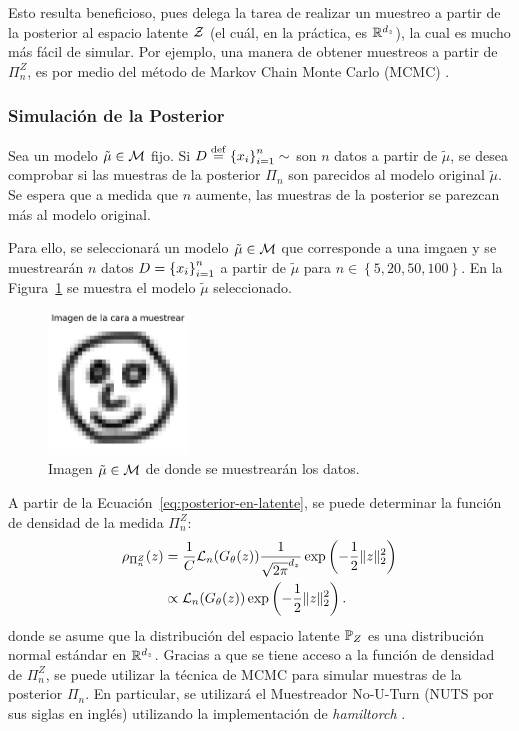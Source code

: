 Esto resulta beneficioso, pues delega la tarea de realizar un muestreo a partir de la posterior al espacio latente $\mathcal{Z}$ (el cuál, en la práctica, es $\mathbb{R}^{d_z}$), la cual es mucho más fácil de simular. Por ejemplo, una manera de obtener muestreos a partir de $\Pi^Z_n$, es por medio del método de Markov Chain Monte Carlo (MCMC) \cite{andrieu2003introduction,brooks2011handbook,goodman2010ensemble}.

\subsubsection{Simulación de la Posterior}\label{sssec:sim-posterior}  %

Sea un modelo $\tilde\mu\in \operatorname{\mathcal{M}}$ fijo. Si $D \stackrel{\mathrm{def}}{=} \left\{ x_i \right\}_{i=1}^n \sim$ son $n$ datos a partir de $\tilde\mu$, se desea comprobar si las muestras de la posterior $\Pi_n$ son parecidos al modelo original $\tilde\mu$. Se espera que a medida que $n$ aumente, las muestras de la posterior se parezcan más al modelo original.

Para ello, se seleccionará un modelo $\tilde\mu\in \operatorname{\mathcal{M}}$ que corresponde a una imgaen y se muestrearán $n$ datos $D = \left\{ x_i \right\}_{i=1}^n$ a partir de $\tilde\mu$ para $n\in\left\{ 5, 20, 50, 100 \right\}$.
En la Figura~\ref{fig:image-sampler-i-37} se muestra el modelo $\tilde\mu$ seleccionado.
\begin{figure}[H]
    \centering
    \includegraphics[width=0.33\textwidth]{img/mcmc/image-sampler-i-37.pdf}
    \caption{Imagen $\tilde\mu\in \operatorname{\mathcal{M}}$ de donde se muestrearán los datos.}
    \label{fig:image-sampler-i-37}
\end{figure}

A partir de la Ecuación~\ref{eq:posterior-en-latente}, se puede determinar la función de densidad de la medida $\Pi^Z_n$:
\begin{align}
    \rho_{\Pi^Z_n}(z)
     & = \frac{1}{C} \mathcal{L}_n(G_\theta(z)) \frac{1}{\sqrt{2\pi}^{d_z}} \exp\left( -\frac{1}{2} \| z \|_2^2 \right)         \\
     & \propto \mathcal{L}_n(G_\theta(z)) \exp\left( -\frac{1}{2} \| z \|_2^2 \right). \label{eq:posterior-en-latente-densidad}
\end{align}
donde se asume que la distribución del espacio latente $\Prob_Z$ es una distribución normal estándar en $\mathbb{R}^{d_z}$.
Gracias a que se tiene acceso a la función de densidad de $\Pi^Z_n$, se puede utilizar la técnica de MCMC para simular muestras de la posterior $\Pi_n$. En particular, se utilizará el Muestreador No-U-Turn (NUTS por sus siglas en inglés) \cite{hoffman2014no} utilizando la implementación de \textit{hamiltorch} \cite{cobb2019introducing}.

